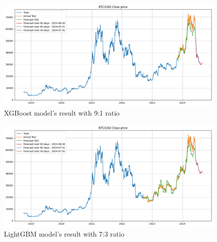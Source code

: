 \documentclass{ieeeojies}
\begin{document}
\begin{figure}[H]
    \centering
    \includegraphics[width=0.8\linewidth]{./././visualize/XGBoost/BTC-90-10.png}
    \caption{XGBoost model’s result with 9:1 ratio}
    \label{fig:19}
\end{figure}
\begin{figure}[H]
    \centering
    \includegraphics[width=0.8\linewidth]{./././visualize/LightGBM/BTC-70-30.png}
    \caption{LightGBM model’s result with 7:3 ratio}
    \label{fig:20}
\end{figure}
\end{document}
